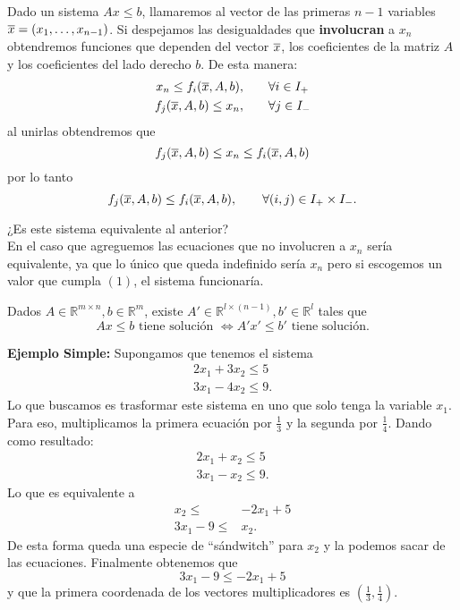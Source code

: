 Dado un sistema $Ax\le b$, llamaremos al vector de las primeras $n-1$ variables $\overline{x}=(x_1,\ldots,x_{n-1})$. Si despejamos las desigualdades que \textbf{involucran} a $x_n$ obtendremos funciones que dependen del vector $\overline{x}$, los coeficientes de la matriz $A$ y los coeficientes del lado derecho $b$. De esta manera:
\begin{align*}
    x_n \le f_i(\overline{x},A,b), & \qquad \forall i \in I_+\\
    f_j(\overline{x},A,b) \le x_n, & \qquad \forall j \in I_-
\end{align*}
al unirlas obtendremos que 
\begin{equation}
    f_j(\overline{x},A,b) \le x_n \le f_i(\overline{x},A,b)   
\end{equation}
por lo tanto
$$f_j(\overline{x},A,b) \le f_i(\overline{x},A,b), \qquad \forall (i,j) \in I_+ \times I_-.$$

¿Es este sistema equivalente al anterior?\\
En el caso que agreguemos las ecuaciones que no involucren a $x_n$ sería equivalente, ya que lo único que queda indefinido sería $x_n$ pero si escogemos un valor que cumpla $(1)$, el sistema funcionaría.
\begin{teo}
Dados $A \in \mathbb{R}^{m \times n}, b \in \mathbb{R}^m$, existe $A' \in \mathbb{R}^{l \times (n-1)}, b' \in \mathbb{R}^l$ tales que
$$Ax \le b \text{ tiene solución } \Longleftrightarrow A'x' \le b' \text{ tiene solución}.$$
\end{teo}

\noindent\textbf{Ejemplo Simple: }Supongamos que tenemos el sistema 
\begin{align*}
    2x_1+3x_2 \le 5\\
    3x_1-4x_2 \le 9.
\end{align*}
Lo que buscamos es trasformar este sistema  en uno que solo tenga la variable $x_1$. Para eso, multiplicamos la primera ecuación por $\frac{1}{3}$ y la segunda por $\frac{1}{4}$. Dando como resultado:
\begin{align*}
        2x_1 + x_2 \le 5\\
        3x_1 - x_2 \le 9.
\end{align*}
Lo que es equivalente a 
\begin{align*}
         x_2 \le & - 2x_1 + 5\\
        3x_1 - 9  \le & x_2.
\end{align*}
De esta forma queda una especie de ``sándwitch'' para $x_2$ y la podemos sacar de las ecuaciones. Finalmente obtenemos que
$$3x_1 - 9  \le - 2x_1 + 5$$
y que la primera coordenada de los vectores multiplicadores es 
$(\frac{1}{3},\frac{1}{4}).$

